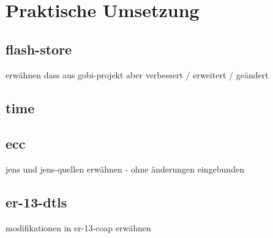\chapter{Praktische Umsetzung}

\section{flash-store}
erwähnen dass aus gobi-projekt aber verbessert / erweitert / geändert

\section{time}

\section{ecc}
jens und jens-quellen erwähnen - ohne änderungen eingebunden

\section{er-13-dtls}
modifikationen in er-13-coap erwähnen